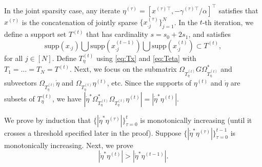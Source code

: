 \documentclass[11pt,journal]{IEEEtran}
\newcommand{\T}{\top}
\newcommand{\supp}{\mathrm{supp}}
\begin{document}
\begin{IEEEproof}
In the joint sparsity case, any iterate $\eta^{(\tau)} = [x^{(\tau)\T}, -\gamma^{(\tau)\T}/\alpha]^\T$ satisfies that $x^{(\tau)}$ is the concatenation of jointly sparse $\{x_{\cdot j}^{(\tau)}\}_{j=1}^N$. 
In the $t$-th iteration, we define a support set $T^{(t)}$ that has cardinality $s = s_0 + 2s_1$, and satisfies
\[
\supp(x_{\cdot j}) \bigcup \supp(x_{\cdot j}^{(t-1)}) \bigcup \supp(x_{\cdot j}^{(t)}) \subset T^{(t)},
\]
for all $j\in[N]$. Define $T_\eta^{(t)}$ using \eqref{eq:Tx} and \eqref{eq:Teta} with $T_1 = \dots = T_N = T^{(t)}$. Next, we focus on the submatrix $\Omega_{T_\eta^{(t)}} G \Omega_{T_\eta^{(t)}}^*$ and subvectors $\Omega_{T_\eta^{(t)}} \dot{\eta}$ and $\Omega_{T_\eta^{(t)}} \eta^{(t)}$, etc. Since the supports of $\eta^{(t)}$ and $\dot{\eta}$ are subsets of $T_\eta^{(t)}$, we have $|\dot{\eta}^*\Omega_{T_\eta^{(t)}}^*\Omega_{T_\eta^{(t)}}\eta^{(t)}| = |\dot{\eta}^*\eta^{(t)}|$.


We prove by induction that $\{|\dot{\eta}^*\eta^{(\tau)}|\}_{\tau=0}^t$ is monotonically increasing (until it crosses a threshold specified later in the proof). Suppose $\{|\dot{\eta}^*\eta^{(\tau)}|\}_{\tau=0}^{t-1}$ is monotonically increasing. Next, we prove 
\[
|\dot{\eta}^*\eta^{(t)}| > |\dot{\eta}^*\eta^{(t-1)}|.
\]


\end{IEEEproof}
\end{document}
